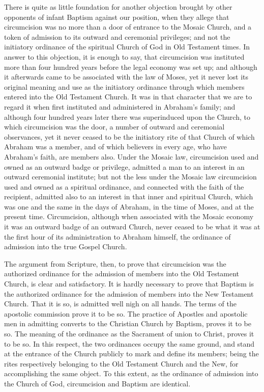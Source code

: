 \documentclass[
  english,
]{book}
\begin{document}
There is quite as little foundation for another objection brought by other opponents of infant Baptism against our position, when they allege that circumcision was no more than a door of entrance to the Mosaic Church, and a token of admission to its outward and ceremonial privileges; and not the initiatory ordinance of the spiritual Church of God in Old Testament times. In answer to this objection, it is enough to say, that circumcision was instituted more than four hundred years before the legal economy was set up; and although it afterwards came to be associated with the law of Moses, yet it never lost its original meaning and use as the initiatory ordinance through which members entered into the Old Testament Church. It was in that character that we are to regard it when first instituted and administered in Abraham's family; and although four hundred years later there was superinduced upon the Church, to which circumcision was the door, a number of outward and ceremonial observances, yet it never ceased to be the initiatory rite of that Church of which Abraham was a member, and of which believers in every age, who have Abraham's faith, are members also. Under the Mosaic law, circumcision used and owned as an outward badge or privilege, admitted a man to an interest in an outward ceremonial institute; but not the less under the Mosaic law circumcision used and owned as a spiritual ordinance, and connected with the faith of the recipient, admitted also to an interest in that inner and spiritual Church, which was one and the same in the days of Abraham, in the time of Moses, and at the present time. Circumcision, although when associated with the Mosaic economy it was an outward badge of an outward Church, never ceased to be what it was at the first hour of its administration to Abraham himself, the ordinance of admission into the true Gospel Church.

The argument from Scripture, then, to prove that circumcision was the authorized ordinance for the admission of members into the Old Testament Church, is clear and satisfactory. It is hardly necessary to prove that Baptism is the authorized ordinance for the admission of members into the New Testament Church. That it is so, is admitted well nigh on all hands. The terms of the apostolic commission prove it to be so. The practice of Apostles and apostolic men in admitting converts to the Christian Church by Baptism, proves it to be so. The meaning of the ordinance as the Sacrament of union to Christ, proves it to be so. In this respect, the two ordinances occupy the same ground, and stand at the entrance of the Church publicly to mark and define its members; being the rites respectively belonging to the Old Testament Church and the New, for accomplishing the same object. To this extent, as the ordinance of admission into the Church of God, circumcision and Baptism are identical.
\end{document}
